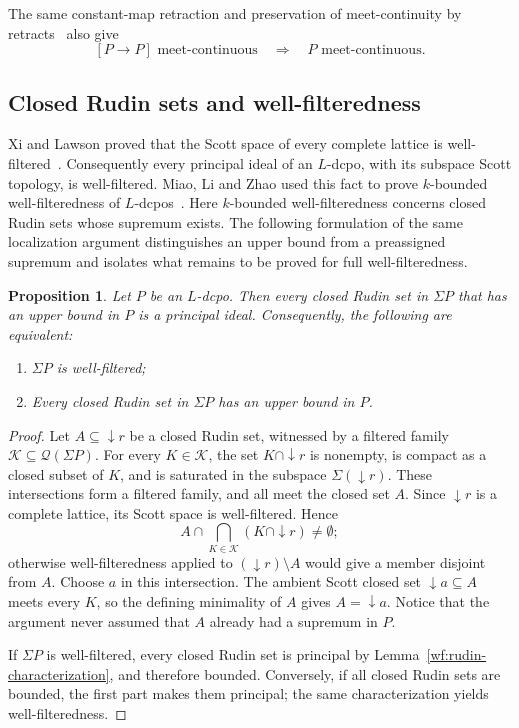 \documentclass[fleqn,preprint,3p,a4paper]{elsarticle}
\newtheorem{proposition}[theorem]{Proposition}
\theoremstyle{definition}
\begin{document}
The same constant-map retraction and preservation of meet-continuity by retracts~\cite[Proposition~3.1.7]{Jia} also give
\[
 [P\to P]\text{ meet-continuous}\quad\Longrightarrow\quad P\text{ meet-continuous}.
\]

\subsection{Closed Rudin sets and well-filteredness}\label{local:subsec:rudin}
Xi and Lawson proved that the Scott space of every complete lattice is well-filtered~\cite{XiLawson}. Consequently every principal ideal of an $L$-dcpo, with its subspace Scott topology, is well-filtered. Miao, Li and Zhao used this fact to prove $k$-bounded well-filteredness of $L$-dcpos~\cite[Lemma~4.6 and Theorem~4.8]{MLZ}. Here $k$-bounded well-filteredness concerns closed Rudin sets whose supremum exists. The following formulation of the same localization argument distinguishes an upper bound from a preassigned supremum and isolates what remains to be proved for full well-filteredness.

\begin{proposition}\label{local:rudin-boundedness}
Let $P$ be an $L$-dcpo. Then every closed Rudin set in $\Sigma P$ that has an upper bound in $P$ is a principal ideal. Consequently, the following are equivalent:
\begin{enumerate}[\rm (1)]
\item $\Sigma P$ is well-filtered;
\item Every closed Rudin set in $\Sigma P$ has an upper bound in $P$.
\end{enumerate}
\end{proposition}
\begin{proof}
Let $A\subseteq{\downarrow} r$ be a closed Rudin set, witnessed by a filtered family $\mathcal K\subseteq\mathcal Q(\Sigma P)$. For every $K\in\mathcal K$, the set $K\cap{\downarrow} r$ is nonempty, is compact as a closed subset of $K$, and is saturated in the subspace $\Sigma({\downarrow} r)$. These intersections form a filtered family, and all meet the closed set $A$. Since ${\downarrow} r$ is a complete lattice, its Scott space is well-filtered. Hence
\[
 A\cap\bigcap_{K\in\mathcal K}(K\cap{\downarrow} r)\ne\emptyset;
\]
otherwise well-filteredness applied to $({\downarrow} r)\setminus A$ would give a member disjoint from $A$. Choose $a$ in this intersection. The ambient Scott closed set ${\downarrow} a\subseteq A$ meets every $K$, so the defining minimality of $A$ gives $A={\downarrow} a$. Notice that the argument never assumed that $A$ already had a supremum in $P$.

If $\Sigma P$ is well-filtered, every closed Rudin set is principal by Lemma~\ref{wf:rudin-characterization}, and therefore bounded. Conversely, if all closed Rudin sets are bounded, the first part makes them principal; the same characterization yields well-filteredness.
\end{proof}
\end{document}
